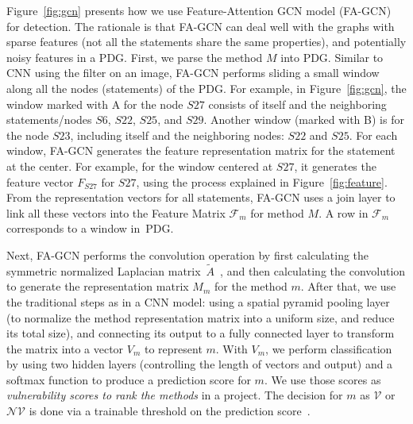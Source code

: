 Figure~\ref{fig:gcn} presents how we use Feature-Attention GCN model
(FA-GCN)~\cite{FAGCN} for detection. The rationale is that FA-GCN can
deal well with the graphs with sparse features (not all the statements
share the same properties), and potentially noisy features in a PDG.
First, we parse the method $M$ into PDG. Similar to CNN using the
filter on an image, FA-GCN performs sliding a small window along all
the nodes (statements) of the PDG. For example, in
Figure~\ref{fig:gcn}, the window marked with A for the node
$S27$ consists of itself and the neighboring statements/nodes $S6$,
$S22$, $S25$, and $S29$. Another window (marked with B) is
for the node $S23$, including itself and the neighboring nodes:
$S22$ and $S25$. For each window, FA-GCN generates the feature
representation matrix for the statement at the center. For example,
for the window centered at $S27$, it generates the feature vector
$F_{S27}$ for $S27$, using the process explained in
Figure~\ref{fig:feature}. From the representation vectors for
all statements, FA-GCN uses a join layer to link all these vectors
into the Feature Matrix $\mathcal{F}_{m}$ for method $M$. A row in
$\mathcal{F}_m$ corresponds to a window in~PDG.

Next, FA-GCN performs the convolution operation by first calculating
the symmetric normalized Laplacian matrix~$\tilde{A}$~\cite{GCN16},
and then calculating the convolution to generate the representation
matrix $M_{m}$ for the method $m$. After that, we use the traditional
steps as in a CNN model: using a spatial pyramid pooling layer (to
normalize the method representation matrix into a uniform size, and
reduce its total size), and connecting its output to a fully connected
layer to transform the matrix into a vector $V_m$ to represent
$m$. With $V_m$, we perform classification by using two hidden layers
(controlling the length of vectors and output) and a softmax function
to produce a prediction score for $m$. We use those scores as {\em
  vulnerability scores to rank the methods} in a project. The decision
for $m$ as $\mathcal{V}$ or $\mathcal{NV}$ is done via a trainable
threshold on the prediction score~\cite{li2018vuldeepecker,li2019improving}.





